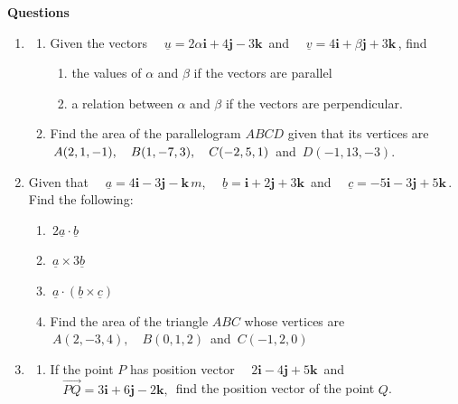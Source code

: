 \documentclass[11pt,a4paper]{article}
\theoremstyle{definition}
\begin{document}
\textbf{Questions}
\begin{enumerate}
\item 
\begin{enumerate}
       \item Given the vectors $\quad  \underline{u} = 2\alpha\textbf{i} + 4\textbf{j} - 3\textbf{k}\,$ and $\quad  \underline{v} = 4\textbf{i} + \beta\textbf{j} + 3\textbf{k}\,$, find
\begin{enumerate}
            \item the values of $\alpha$ and $\beta$ if the vectors are parallel
            \item a relation between $\alpha$ and $\beta$ if the vectors are perpendicular.\\
\end{enumerate}


       \item Find the area of the parallelogram $ABCD$ given that its vertices are $\, A(2,1,-1),\\ \quad  B(1,-7,3),\quad  C(-2,5,1)\,$ and $\, D(-1, 13, -3)$.\\
\end{enumerate}

\item Given that $\quad  \underline{a} = 4\textbf{i} - 3\textbf{j} - \textbf{k}\,m$, $\quad  \underline{b} = \textbf{i} + 2\textbf{j} + 3\textbf{k}\,$ and $\quad  \underline{c} = -5\textbf{i} - 3\textbf{j} + 5\textbf{k}\,$.\\

Find the following:
\begin{enumerate}
    \item $\, 2\underline{a}\cdot \underline{b}$
    
    \item $\, \underline{a}\times 3\underline{b}$
    
    \item $\, \underline{a}\cdot \left(\underline{b}\times \underline{c}\right)$
    
    
    \item Find the area of the triangle $ABC$ whose vertices are $\, A(2,-3,4),\quad  B(0,1,2)\,$ and $\, C(-1,2,0)$\\
\end{enumerate}



\item 
\begin{enumerate}
      \item If the point $P$ has position vector $\quad  2\textbf{i} - 4\textbf{j} + 5\textbf{k}\,$ and $\quad  \overrightarrow{PQ} = 3\textbf{i} + 6\textbf{j} - 2\textbf{k},\,$ find the position vector of the point $Q$.
      

\end{enumerate}
\end{enumerate}
\end{document}
